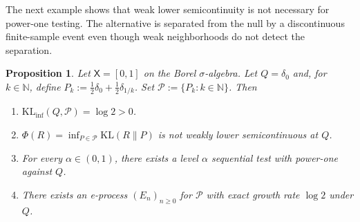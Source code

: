 \documentclass[11pt]{article}
\newcommand{\KL}{\mathrm{KL}}
\newcommand{\KLinf}{\mathrm{KL}_{\mathrm{inf}}}
\newcommand{\Pcal}{\mathcal{P}}
\newcommand{\X}{\mathsf{X}}
\newtheorem{proposition}[theorem]{Proposition}
\theoremstyle{definition}
\theoremstyle{definition}
\begin{document}
The next example shows that weak lower semicontinuity is not necessary for power-one testing.  The alternative is separated from the null by a discontinuous finite-sample event even though weak neighborhoods do not detect the separation.

\begin{proposition}\label{prop:weaklsc-not-necessary}
Let $\X=[0,1]$ on the Borel $\sigma$-algebra. Let $Q=\delta_0$ and, for $k\in\mathbb N$, define $P_k:=\frac12\delta_0 +\frac12\delta_{1/k}$. Set $\Pcal:=\{P_k:k\in\mathbb N\}$. Then
\begin{enumerate}
    \item $\KLinf(Q,\Pcal)=\log 2>0$.
    \item $\Phi(R)=\inf_{P\in\Pcal}\KL(R\|P)$ is not weakly lower semicontinuous at $Q$.
    \item For every $\alpha\in(0,1)$, there exists a level $\alpha$ sequential test with power-one against $Q$.
    \item There exists an e-process $(E_n)_{n\ge 0}$ for $\Pcal$ with exact growth rate $\log 2$ under $Q$.
\end{enumerate}
\end{proposition}
\end{document}

